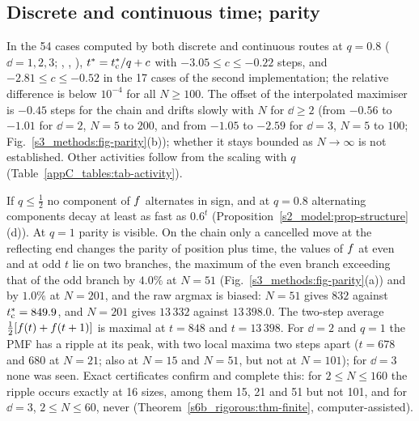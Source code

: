 \subsection{Discrete and continuous time; parity}\label{sup_methods:ssec-parity}

In the 54 cases computed by both discrete and continuous routes at $q=0.8$ ($\dd=1,2,3$; \CC, \CtM, \MtC),
$t^{*}=t^{*}_{\mathrm{c}}/q+c$ with $-3.05\le c\le-0.22$ steps, and $-2.81\le c\le-0.52$ in the 17 cases of the second
implementation; the relative difference is below $10^{-4}$ for all $N\ge100$.
The offset of the interpolated maximiser is $-0.45$ steps for the chain and drifts slowly with $N$ for $\dd\ge2$
(from $-0.56$ to $-1.01$ for $\dd=2$, $N=5$ to $200$, and from $-1.05$ to $-2.59$ for $\dd=3$, $N=5$ to $100$;
Fig.~\ref{s3_methods:fig-parity}(b)); whether it stays bounded as $N\to\infty$ is not established.
Other activities follow from the scaling with $q$ (Table~\ref{appC_tables:tab-activity}).

If $q\le\tfrac12$ no component of $f$ alternates in sign, and at $q=0.8$ alternating components decay at least as
fast as $0.6^{t}$ (Proposition~\ref{s2_model:prop-structure}(d)). At $q=1$ parity is visible. On the chain only a
cancelled move at the reflecting end changes the parity of position plus time, the values of $f$ at even and at
odd $t$ lie on two branches, the maximum of the even branch exceeding that of the odd branch by $4.0\%$ at $N=51$
(Fig.~\ref{s3_methods:fig-parity}(a)) and by $1.0\%$ at $N=201$, and the raw argmax is biased: $N=51$ gives $832$
against $t^{*}_{\mathrm{c}}=849.9$, and $N=201$ gives $13\,332$ against $13\,398.0$. The two-step average
$\tfrac12[f(t)+f(t+1)]$ is maximal at $t=848$ and $t=13\,398$.
For $\dd=2$ and $q=1$ the PMF has a ripple at its peak, with two local maxima two steps apart ($t=678$ and $680$ at
$N=21$; also at $N=15$ and $N=51$, but not at $N=101$); for $\dd=3$ none was seen. Exact certificates confirm and
complete this: for $2\le N\le160$ the ripple occurs exactly at 16 sizes, among them 15, 21 and 51 but not 101, and
for $\dd=3$, $2\le N\le60$, never (Theorem~\ref{s6b_rigorous:thm-finite}, computer-assisted).

